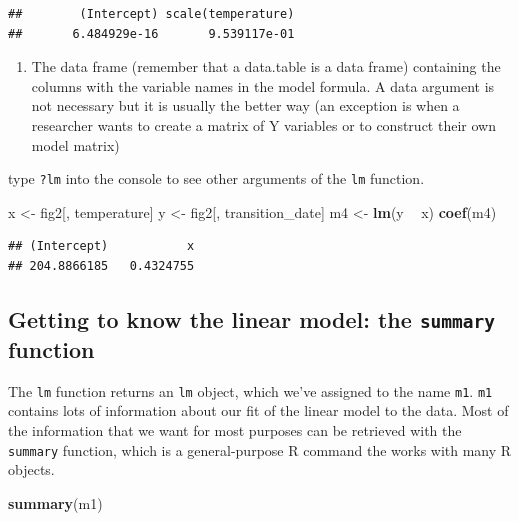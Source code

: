 \documentclass[]{book}
\newenvironment{Shaded}{\begin{snugshade}}{\end{snugshade}}
\newcommand{\KeywordTok}[1]{\textcolor[rgb]{0.13,0.29,0.53}{\textbf{#1}}}
\newcommand{\NormalTok}[1]{#1}
\newcommand{\OperatorTok}[1]{\textcolor[rgb]{0.81,0.36,0.00}{\textbf{#1}}}
\newcommand{\StringTok}[1]{\textcolor[rgb]{0.31,0.60,0.02}{#1}}
\providecommand{\tightlist}{%
  \setlength{\itemsep}{0pt}\setlength{\parskip}{0pt}}
\begin{document}
\begin{verbatim}
##        (Intercept) scale(temperature) 
##       6.484929e-16       9.539117e-01
\end{verbatim}

\begin{enumerate}
\def\labelenumi{\arabic{enumi}.}
\setcounter{enumi}{1}
\tightlist
\item
  The data frame (remember that a data.table is a data frame) containing the columns with the variable names in the model formula. A data argument is not necessary but it is usually the better way (an exception is when a researcher wants to create a matrix of Y variables or to construct their own model matrix)
\end{enumerate}

type \texttt{?lm} into the console to see other arguments of the \texttt{lm} function.

\begin{Shaded}
\begin{Highlighting}[]
\NormalTok{x <-}\StringTok{ }\NormalTok{fig2[, temperature]}
\NormalTok{y <-}\StringTok{ }\NormalTok{fig2[, transition_date]}
\NormalTok{m4 <-}\StringTok{ }\KeywordTok{lm}\NormalTok{(y }\OperatorTok{~}\StringTok{ }\NormalTok{x)}
\KeywordTok{coef}\NormalTok{(m4)}
\end{Highlighting}
\end{Shaded}

\begin{verbatim}
## (Intercept)           x 
## 204.8866185   0.4324755
\end{verbatim}

\hypertarget{getting-to-know-the-linear-model-the-summary-function}{%
\subsection{\texorpdfstring{Getting to know the linear model: the \texttt{summary} function}{Getting to know the linear model: the summary function}}\label{getting-to-know-the-linear-model-the-summary-function}}

The \texttt{lm} function returns an \texttt{lm} object, which we've assigned to the name \texttt{m1}. \texttt{m1} contains lots of information about our fit of the linear model to the data. Most of the information that we want for most purposes can be retrieved with the \texttt{summary} function, which is a general-purpose R command the works with many R objects.

\begin{Shaded}
\begin{Highlighting}[]
\KeywordTok{summary}\NormalTok{(m1)}
\end{Highlighting}
\end{Shaded}
\end{document}
